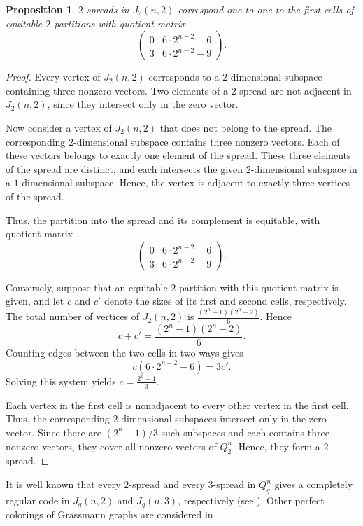 \documentclass[11pt]{article}
\newtheorem{claim}{Proposition}[section]
\theoremstyle{definition}
\begin{document}
{{{\begin{claim}
$2$-spreads in $J_2(n,2)$ correspond one-to-one to the first cells of equitable $2$-partitions with quotient matrix
\[
\begin{pmatrix}
0&6\cdot2^{n-2}-6\\
3&6\cdot2^{n-2}-9
\end{pmatrix}.
\]
\end{claim}

\begin{proof}
Every vertex of $J_2(n,2)$ corresponds to a $2$-dimensional subspace containing three nonzero vectors. Two elements of a $2$-spread are not adjacent in $J_2(n,2)$, since they intersect only in the zero vector.

Now consider a vertex of $J_2(n,2)$ that does not belong to the spread. The corresponding $2$-dimensional subspace contains three nonzero vectors. Each of these vectors belongs to exactly one element of the spread. These three elements of the spread are distinct, and each intersects the given $2$-dimensional subspace in a $1$-dimensional subspace. Hence, the vertex is adjacent to exactly three vertices of the spread.

Thus, the partition into the spread and its complement is equitable, with quotient matrix
\[
\begin{pmatrix}
0&6\cdot2^{n-2}-6\\
3&6\cdot2^{n-2}-9
\end{pmatrix}.
\]

Conversely, suppose that an equitable $2$-partition with this quotient matrix is given, and let $c$ and $c'$ denote the sizes of its first and second cells, respectively. The total number of vertices of $J_2(n,2)$ is
$
\frac{(2^n-1)(2^n-2)}{6}$.
Hence
\[
c+c'=\frac{(2^n-1)(2^n-2)}{6}.
\]
Counting edges between the two cells in two ways gives
\[
c(6\cdot2^{n-2}-6)=3c'.
\]
Solving this system yields
$c=\frac{2^n-1}{3}$.

Each vertex in the first cell is nonadjacent to every other vertex in the first cell. Thus, the corresponding $2$-dimensional subspaces intersect only in the zero vector. Since there are $(2^n-1)/3$ such subspaces and each contains three nonzero vectors, they cover all nonzero vectors of $Q_2^n$. Hence, they form a $2$-spread.
\end{proof}


It is well known that every $2$-spread and every $3$-spread in $Q_q^n$ gives a completely regular code in $J_q(n,2)$ and $J_q(n,3)$, respectively (see \cite{Martin98}). Other perfect colorings of Grassmann graphs are considered in \cite{Mog22}.

}}}
\end{document}
